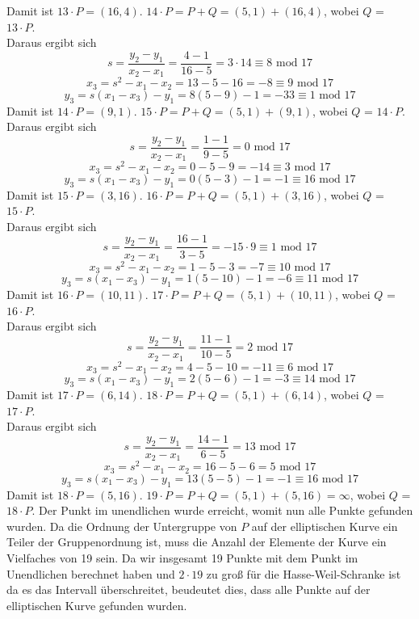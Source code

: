 Damit ist $13 \cdot P = (16, 4)$. $14 \cdot P = P + Q = (5, 1) + (16, 4)$, wobei $Q$ = $13 \cdot P$.\\
Daraus ergibt sich 
$$s = \frac{y_2 - y_1}{x_2 -x_1} = \frac{4 - 1}{16 - 5} = 3 \cdot 14 \equiv 8 \text{ mod } 17$$
$$x_3 = s^2 - x_1 - x_2 = 13 - 5 - 16 = - 8 \equiv 9 \text{ mod } 17$$
$$y_3 = s(x_1 - x_3) - y_1 = 8(5 - 9) - 1 = - 33 \equiv 1 \text{ mod } 17$$
Damit ist $14 \cdot P = (9, 1)$. $15 \cdot P = P + Q = (5, 1) + (9, 1)$, wobei $Q$ = $14 \cdot P$.\\
Daraus ergibt sich 
$$s = \frac{y_2 - y_1}{x_2 -x_1} = \frac{1 - 1}{9 - 5} = 0 \text{ mod } 17$$
$$x_3 = s^2 - x_1 - x_2 = 0 - 5 - 9 = - 14 \equiv 3 \text{ mod } 17$$
$$y_3 = s(x_1 - x_3) - y_1 = 0(5 - 3) - 1 = - 1 \equiv 16 \text{ mod } 17$$
Damit ist $15 \cdot P = (3, 16)$. $16 \cdot P = P + Q = (5, 1) + (3, 16)$, wobei $Q$ = $15 \cdot P$.\\
Daraus ergibt sich 
$$s = \frac{y_2 - y_1}{x_2 -x_1} = \frac{16 - 1}{3 - 5} = - 15 \cdot 9 \equiv 1 \text{ mod } 17$$
$$x_3 = s^2 - x_1 - x_2 = 1 - 5 - 3 = - 7 \equiv 10 \text{ mod } 17$$
$$y_3 = s(x_1 - x_3) - y_1 = 1(5 - 10) - 1 = - 6 \equiv 11 \text{ mod } 17$$
Damit ist $16 \cdot P = (10, 11)$. $17 \cdot P = P + Q = (5, 1) + (10, 11)$, wobei $Q$ = $16 \cdot P$.\\
Daraus ergibt sich 
$$s = \frac{y_2 - y_1}{x_2 -x_1} = \frac{11 - 1}{10 - 5} = 2 \text{ mod } 17$$
$$x_3 = s^2 - x_1 - x_2 = 4 - 5 - 10 = - 11 \equiv 6 \text{ mod } 17$$
$$y_3 = s(x_1 - x_3) - y_1 = 2(5 - 6) - 1 = - 3 \equiv 14 \text{ mod } 17$$
Damit ist $17 \cdot P = (6, 14)$. $18 \cdot P = P + Q = (5, 1) + (6, 14)$, wobei $Q$ = $17 \cdot P$.\\
Daraus ergibt sich 
$$s = \frac{y_2 - y_1}{x_2 -x_1} = \frac{14 - 1}{6 - 5} = 13 \text{ mod } 17$$
$$x_3 = s^2 - x_1 - x_2 = 16 - 5 - 6 = 5 \text{ mod } 17$$
$$y_3 = s(x_1 - x_3) - y_1 = 13(5 - 5) - 1 = - 1 \equiv 16 \text{ mod } 17$$
Damit ist $18 \cdot P = (5, 16)$. $19 \cdot P = P + Q = (5, 1) + (5, 16) = \infty $, wobei $Q$ = $18 \cdot P$. Der Punkt im unendlichen wurde erreicht, womit nun alle Punkte gefunden wurden. Da die Ordnung der Untergruppe von $P$ auf der elliptischen Kurve ein Teiler der Gruppenordnung ist, muss die Anzahl der Elemente der Kurve ein Vielfaches von 19 sein. Da wir insgesamt 19 Punkte mit dem Punkt im Unendlichen berechnet haben und $2 \cdot 19$ zu groß für die Hasse-Weil-Schranke ist da es das Intervall überschreitet, beudeutet dies, dass alle Punkte auf der elliptischen Kurve gefunden wurden.\\

